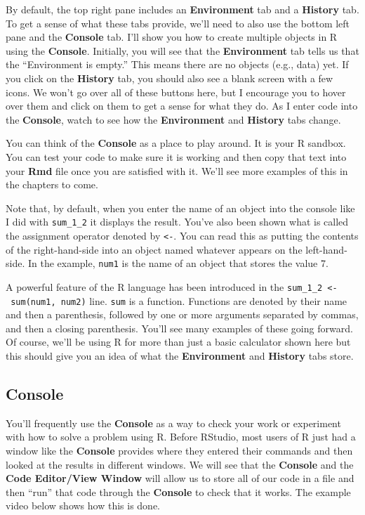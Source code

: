 \documentclass[]{tufte-book}
\begin{document}
By default, the top right pane includes an \textbf{Environment} tab and a \textbf{History} tab. To get a sense of what these tabs provide, we'll need to also use the bottom left pane and the \textbf{Console} tab. I'll show you how to create multiple objects in R using the \textbf{Console}. Initially, you will see that the \textbf{Environment} tab tells us that the ``Environment is empty.'' This means there are no objects (e.g., data) yet. If you click on the \textbf{History} tab, you should also see a blank screen with a few icons. We won't go over all of these buttons here, but I encourage you to hover over them and click on them to get a sense for what they do. As I enter code into the \textbf{Console}, watch to see how the \textbf{Environment} and \textbf{History} tabs change.

You can think of the \textbf{Console} as a place to play around. It is your R sandbox. You can test your code to make sure it is working and then copy that text into your \textbf{Rmd} file once you are satisfied with it. We'll see more examples of this in the chapters to come.

Note that, by default, when you enter the name of an object into the console like I did with \texttt{sum\_1\_2} it displays the result. You've also been shown what is called the assignment operator denoted by \texttt{\textless{}-}. You can read this as putting the contents of the right-hand-side into an object named whatever appears on the left-hand-side. In the example, \texttt{num1} is the name of an object that stores the value 7.

A powerful feature of the R language has been introduced in the \texttt{sum\_1\_2\ \textless{}-\ sum(num1,\ num2)} line. \texttt{sum} is a function. Functions are denoted by their name and then a parenthesis, followed by one or more arguments separated by commas, and then a closing parenthesis. You'll see many examples of these going forward. Of course, we'll be using R for more than just a basic calculator shown here but this should give you an idea of what the \textbf{Environment} and \textbf{History} tabs store.

\hypertarget{console}{%
\subsection{Console}\label{console}}

You'll frequently use the \textbf{Console} as a way to check your work or experiment with how to solve a problem using R. Before RStudio, most users of R just had a window like the \textbf{Console} provides where they entered their commands and then looked at the results in different windows. We will see that the \textbf{Console} and the \textbf{Code Editor/View Window} will allow us to store all of our code in a file and then ``run'' that code through the \textbf{Console} to check that it works. The example video below shows how this is done.
\end{document}
